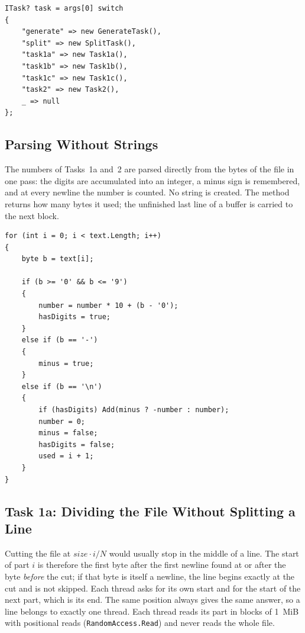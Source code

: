 \documentclass[12pt,a4paper]{article}
\begin{document}
\begin{lstlisting}[style=csharp,caption={Choosing the task in Program.cs}]
ITask? task = args[0] switch
{
    "generate" => new GenerateTask(),
    "split" => new SplitTask(),
    "task1a" => new Task1a(),
    "task1b" => new Task1b(),
    "task1c" => new Task1c(),
    "task2" => new Task2(),
    _ => null
};
\end{lstlisting}

\subsection{Parsing Without Strings}

The numbers of Tasks~1a and~2 are parsed directly from the bytes of the file in one pass: the digits are accumulated into an integer, a minus sign is remembered, and at every newline the number is counted. No string is created. The method returns how many bytes it used; the unfinished last line of a buffer is carried to the next block.

\begin{lstlisting}[style=csharp,caption={The parser of Counts.cs}]
for (int i = 0; i < text.Length; i++)
{
    byte b = text[i];

    if (b >= '0' && b <= '9')
    {
        number = number * 10 + (b - '0');
        hasDigits = true;
    }
    else if (b == '-')
    {
        minus = true;
    }
    else if (b == '\n')
    {
        if (hasDigits) Add(minus ? -number : number);
        number = 0;
        minus = false;
        hasDigits = false;
        used = i + 1;
    }
}
\end{lstlisting}

\subsection{Task 1a: Dividing the File Without Splitting a Line}

Cutting the file at $\mathit{size}\cdot i/N$ would usually stop in the middle of a line. The start of part $i$ is therefore the first byte after the first newline found at or after the byte \emph{before} the cut; if that byte is itself a newline, the line begins exactly at the cut and is not skipped. Each thread asks for its own start and for the start of the next part, which is its end. The same position always gives the same answer, so a line belongs to exactly one thread. Each thread reads its part in blocks of 1~MiB with positional reads (\texttt{RandomAccess.Read}) and never reads the whole file.
\end{document}
